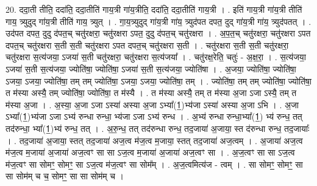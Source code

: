 \documentclass[17pt]{extarticle}
\begin{document}
20. ददा॒ती तीति॒ ददा॑ति॒ ददा॒तीति॑ गाय॒त्री गा॑य॒त्रीति॒ ददा॑ति॒ ददा॒तीति॑ गाय॒त्री । . इति॑ गाय॒त्री गा॑य॒त्री तीति॑ गाय॒ त्र्युदुद् गा॑य॒त्री तीति॑ गाय॒ त्र्युत् । . गा॒य॒त्र्युदुद् गा॑य॒त्री गा॑य॒ त्र्युद॑पत दपत॒ दुद् गा॑य॒त्री गा॑य॒ त्र्युद॑पतत् । . उद॑पत दपत॒ दुदु द॑पत॒च् चतु॑रक्षरा॒ चतु॑रक्षरा ऽपत॒ दुदु द॑पत॒च् चतु॑रक्षरा । . अ॒प॒त॒च् चतु॑रक्षरा॒ चतु॑रक्षरा ऽपत दपत॒च् चतु॑रक्षरा स॒ती स॒ती चतु॑रक्षरा ऽपत दपत॒च् चतु॑रक्षरा स॒ती । . चतु॑रक्षरा स॒ती स॒ती चतु॑रक्षरा॒ चतु॑रक्षरा स॒त्य॑जया॒ ऽजया॑ स॒ती चतु॑रक्षरा॒ चतु॑रक्षरा स॒त्य॑जया᳚ । . चतु॑रक्ष॒रेति॒ चतुः॑ - अ॒क्ष॒रा॒ । . स॒त्य॑जया॒ ऽजया॑ स॒ती स॒त्य॑जया॒ ज्योति॑षा॒ ज्योति॑षा॒ ऽजया॑ स॒ती स॒त्य॑जया॒ ज्योति॑षा । . अ॒जया॒ ज्योति॑षा॒ ज्योति॑षा॒ ऽजया॒ ऽजया॒ ज्योति॑षा॒ तम् तम् ज्योति॑षा॒ ऽजया॒ ऽजया॒ ज्योति॑षा॒ तम् । . ज्योति॑षा॒ तम् तम् ज्योति॑षा॒ ज्योति॑षा॒ त म॑स्या अस्यै॒ तम् ज्योति॑षा॒ ज्योति॑षा॒ त म॑स्यै । . त म॑स्या अस्यै॒ तम् त म॑स्या अ॒जा ऽजा ऽस्यै॒ तम् त म॑स्या अ॒जा । . अ॒स्या॒ अ॒जा ऽजा ऽस्या॑ अस्या अ॒जा ऽभ्या᳚(1॒)भ्य॑जा ऽस्या॑ अस्या अ॒जा ऽभि । . अ॒जा ऽभ्या᳚(1॒)भ्य॑जा ऽजा ऽभ्य॑ रुन्धा रुन्धा॒ भ्य॑जा ऽजा ऽभ्य॑ रुन्ध । . अ॒भ्य॑ रुन्धा रुन्धा॒भ्या᳚(1॒) भ्य॑ रुन्ध॒ तत् तद॑रुन्धा॒ भ्या᳚(1॒)भ्य॑ रुन्ध॒ तत् । . अ॒रु॒न्ध॒ तत् तद॑रुन्धा रुन्ध॒ तद॒जाया॑ अ॒जाया॒ स्त द॑रुन्धा रुन्ध॒ तद॒जायाः᳚ । . तद॒जाया॑ अ॒जाया॒ स्तत् तद॒जाया॑ अज॒त्व म॑ज॒त्व म॒जाया॒ स्तत् तद॒जाया॑ अज॒त्वम् । . अ॒जाया॑ अज॒त्व म॑ज॒त्व म॒जाया॑ अ॒जाया॑ अज॒त्वꣳ सा सा ऽज॒त्व म॒जाया॑ अ॒जाया॑ अज॒त्वꣳ सा । . अ॒ज॒त्वꣳ सा सा ऽज॒त्व म॑ज॒त्वꣳ सा सोमꣳ॒॒ सोमꣳ॒॒ सा ऽज॒त्व म॑ज॒त्वꣳ सा सोम᳚म् । . अ॒ज॒त्वमित्य॑ज - त्वम् । . सा सोमꣳ॒॒ सोमꣳ॒॒ सा सा सोम॑म् च च॒ सोमꣳ॒॒ सा सा सोम॑म् च । \newline
\end{document}
